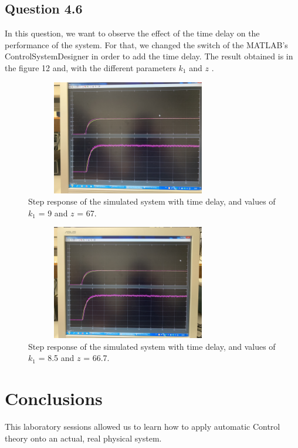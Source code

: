 \documentclass[a4paper,8pt]{extarticle}
\begin{document}
        \subsection*{Question 4.6}
        In this question, we want to observe the effect of the time delay on the performance of the system. For that, we changed the switch of the MATLAB's ControlSystemDesigner in order to add the time delay. The result obtained is in the figure 12 and, with the different parameters $k_1$ and $z$ .
        \begin{figure}[ht]
            \centering
            \includegraphics[width=9cm,height=5cm]{4_6new.jpg} 
            \caption{Step response of the simulated system with time delay, and values of $k_1$ = 9 and $z$ = 67.}
        \end{figure}
        
          \begin{figure}[ht]
            \centering
            \includegraphics[width=9cm,height=5cm]{4_6_2.jpg} 
            \caption{Step response of the simulated system with time delay, and values of $k_1$ = 8.5 and $z$ = 66.7.}
        \end{figure}
        \section{Conclusions}
        This laboratory sessions allowed us to learn how to apply automatic Control theory onto an actual, real physical system.\\
        
\end{document}
